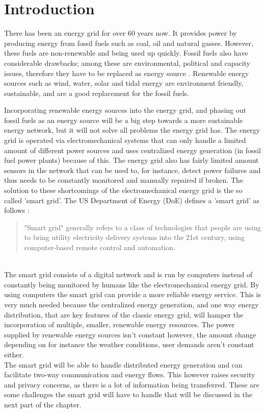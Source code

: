 \section{Introduction}

There has been an energy grid for over 60 years now. It provides power by producing energy from fossil fuels such as coal, oil and natural gasses. However, these fuels are non-renewable and being used up quickly. Fossil fuels also have considerable drawbacks; among these are environmental, political and capacity issues, therefore they have to be replaced as energy source \cite{friedman2008hot}. Renewable energy sources such as wind, water, solar and tidal energy \cite{Tromly2001} are environment friendly, sustainable, and are a good replacement for the fossil fuels.

Incorporating renewable energy sources into the energy grid, and phasing out fossil fuels as an energy source will be a big step towards a more sustainable energy network, but it will not solve all problems the energy grid has. The energy grid is operated via electromechanical systems that can only handle a limited amount of different power sources and uses centralized energy generation (in fossil fuel power plants) because of this. The energy grid also has fairly limited amount sensors in the network that can be used to, for instance, detect power failures and thus needs to be constantly monitored and manually repaired if broken. The solution to these shortcomings of the electromechanical energy grid is the so called 'smart grid'. The US Department of Energy (DoE) defines a 'smart grid' as follows \cite{doe}: 
 
\begin{quote}
"Smart grid" generally refers to a class of technologies that people are using to bring utility electricity delivery systems into the 21st century, using computer-based remote control and automation.
\end{quote}
\\
The smart grid consists of a digital network and is run by computers instead of constantly being monitored by humans like the electromechanical energy grid. By using computers the smart grid can provide a more reliable energy service. This is very much needed because the centralized energy generation, and one way energy distribution, that are key features of the classic energy grid, will hamper the incorporation of multiple, smaller, renewable energy resources. The power supplied by renewable energy sources isn't constant however, the amount change depending on for instance the weather conditions, user demands aren't constant either. \\
The smart grid will be able to handle distributed energy generation and can facilitate two-way communication and energy flows. This however raises security and privacy concerns, as there is a lot of information being transferred. These are some challenges the smart grid will have to handle that will be discussed in the next part of the chapter.
 
